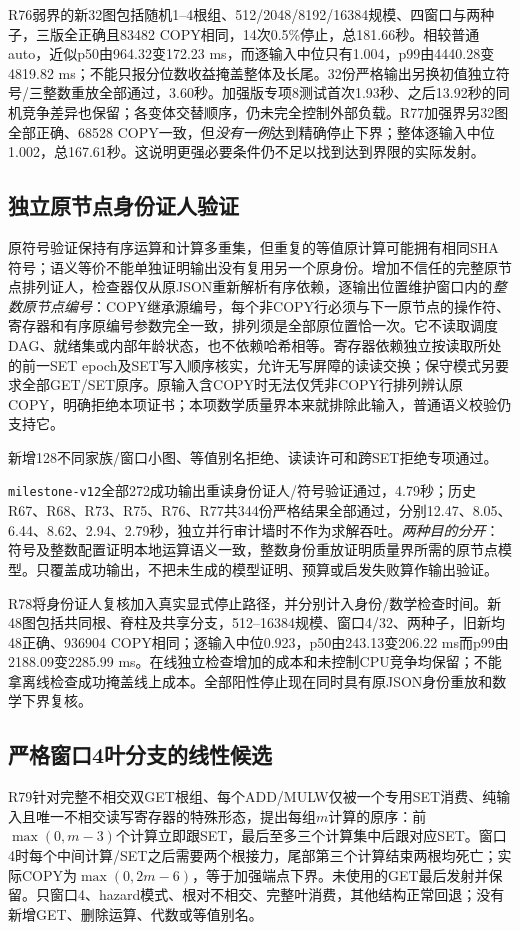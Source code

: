 \documentclass[UTF8,11pt,fontset=fandol]{ctexart}
\begin{document}
R76弱界的新32图包括随机1--4根组、512/2048/8192/16384规模、四窗口与两种子，三版全正确且83482 COPY相同，14次0.5\%停止，总181.66秒。相较普通auto，近似p50由964.32变172.23 ms，而逐输入中位只有1.004，p99由4440.28变4819.82 ms；不能只报分位数收益掩盖整体及长尾。32份严格输出另换初值独立符号/三整数重放全部通过，3.60秒。加强版专项8测试首次1.93秒、之后13.92秒的同机竞争差异也保留；各变体交替顺序，仍未完全控制外部负载。R77加强界另32图全部正确、68528 COPY一致，但\emph{没有一例}达到精确停止下界；整体逐输入中位1.002，总167.61秒。这说明更强必要条件仍不足以找到达到界限的实际发射。

\subsection{独立原节点身份证人验证}
原符号验证保持有序运算和计算多重集，但重复的等值原计算可能拥有相同SHA符号；语义等价不能单独证明输出没有复用另一个原身份。增加不信任的完整原节点排列证人，检查器仅从原JSON重新解析有序依赖，逐输出位置维护窗口内的\emph{整数原节点编号}：COPY继承源编号，每个非COPY行必须与下一原节点的操作符、寄存器和有序原编号参数完全一致，排列须是全部原位置恰一次。它不读取调度DAG、就绪集或内部年龄状态，也不依赖哈希相等。寄存器依赖独立按读取所处的前一SET epoch及SET写入顺序核实，允许无写屏障的读读交换；保守模式另要求全部GET/SET原序。原输入含COPY时无法仅凭非COPY行排列辨认原COPY，明确拒绝本项证书；本项数学质量界本来就排除此输入，普通语义校验仍支持它。

新增128不同家族/窗口小图、等值别名拒绝、读读许可和跨SET拒绝专项通过。

\texttt{milestone-v12}全部272成功输出重读身份证人/符号验证通过，4.79秒；历史R67、R68、R73、R75、R76、R77共344份严格结果全部通过，分别12.47、8.05、6.44、8.62、2.94、2.79秒，独立并行审计墙时不作为求解吞吐。\emph{两种目的分开}：符号及整数配置证明本地运算语义一致，整数身份重放证明质量界所需的原节点模型。只覆盖成功输出，不把未生成的模型证明、预算或启发失败算作输出验证。

R78将身份证人复核加入真实显式停止路径，并分别计入身份/数学检查时间。新48图包括共同根、脊柱及共享分支，512--16384规模、窗口4/32、两种子，旧新均48正确、936904 COPY相同；逐输入中位0.923，p50由243.13变206.22 ms而p99由2188.09变2285.99 ms。在线独立检查增加的成本和未控制CPU竞争均保留；不能拿离线检查成功掩盖线上成本。全部阳性停止现在同时具有原JSON身份重放和数学下界复核。

\subsection{严格窗口4叶分支的线性候选}
R79针对完整不相交双GET根组、每个ADD/MULW仅被一个专用SET消费、纯输入且唯一不相交读写寄存器的特殊形态，提出每组$m$计算的原序：前$\max(0,m-3)$个计算立即跟SET，最后至多三个计算集中后跟对应SET。窗口4时每个中间计算/SET之后需要两个根接力，尾部第三个计算结束两根均死亡；实际COPY为$\max(0,2m-6)$，等于加强端点下界。未使用的GET最后发射并保留。只窗口4、hazard模式、根对不相交、完整叶消费，其他结构正常回退；没有新增GET、删除运算、代数或等值别名。
\end{document}
